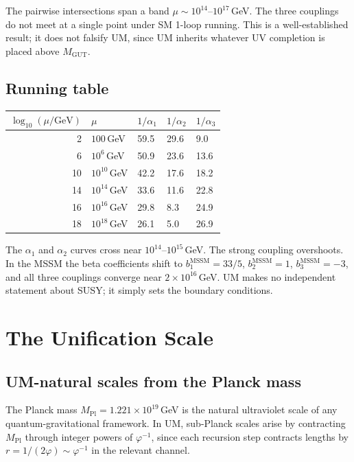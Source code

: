 \documentclass[12pt]{article}
\begin{document}
The pairwise intersections span a band $\mu \sim 10^{14}$--$10^{17}$\,GeV.
The three couplings do not meet at a single point under SM 1-loop running.
This is a well-established result; it does not falsify UM, since UM
inherits whatever UV completion is placed above $M_{\text{GUT}}$.

\subsection{Running table}

\begin{center}
\begin{tabular}{rllll}
\toprule
$\log_{10}(\mu/\text{GeV})$ & $\mu$ & $1/\alpha_1$ & $1/\alpha_2$ & $1/\alpha_3$ \\
\midrule
 2 & $100$\,GeV       & 59.5 & 29.6 &  9.0 \\
 6 & $10^6$\,GeV      & 50.9 & 23.6 & 13.6 \\
10 & $10^{10}$\,GeV   & 42.2 & 17.6 & 18.2 \\
14 & $10^{14}$\,GeV   & 33.6 & 11.6 & 22.8 \\
16 & $10^{16}$\,GeV   & 29.8 &  8.3 & 24.9 \\
18 & $10^{18}$\,GeV   & 26.1 &  5.0 & 26.9 \\
\bottomrule
\end{tabular}
\end{center}

The $\alpha_1$ and $\alpha_2$ curves cross near $10^{14}$--$10^{15}$\,GeV.
The strong coupling overshoots. In the MSSM the beta coefficients shift to
$b_1^{\text{MSSM}} = 33/5$, $b_2^{\text{MSSM}} = 1$, $b_3^{\text{MSSM}} = -3$,
and all three couplings converge near $2\times10^{16}$\,GeV. UM makes no
independent statement about SUSY; it simply sets the boundary conditions.

\section{The Unification Scale}

\subsection{UM-natural scales from the Planck mass}

The Planck mass $M_{\text{Pl}} = 1.221 \times 10^{19}$\,GeV is the natural
ultraviolet scale of any quantum-gravitational framework. In UM, sub-Planck
scales arise by contracting $M_{\text{Pl}}$ through integer powers of
$\varphi^{-1}$, since each recursion step contracts lengths by $r = 1/(2\varphi)
\sim \varphi^{-1}$ in the relevant channel.
\end{document}
